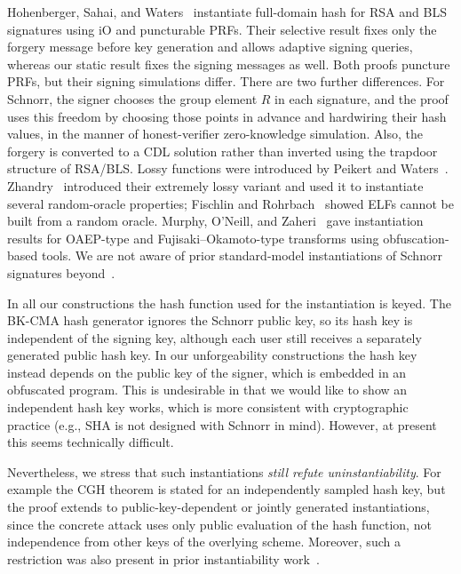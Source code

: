  Hohenberger, Sahai, and Waters~\cite{EC:HohSahWat14} instantiate full-domain hash for RSA and BLS signatures using iO and puncturable PRFs. Their selective result fixes only the forgery message before key generation and allows adaptive signing queries, whereas our static result fixes the signing messages as well. Both proofs puncture PRFs, but their signing simulations differ. There are two further differences. For Schnorr, the signer chooses the group element $R$ in each signature, and the proof uses this freedom by choosing those points in advance and hardwiring their hash values, in the manner of honest-verifier zero-knowledge simulation. Also, the forgery is converted to a CDL solution rather than inverted using the trapdoor structure of RSA/BLS. Lossy functions were introduced by Peikert and Waters~\cite{STOC:PeiWat08,JACM:PeiWat11}. Zhandry~\cite{C:Zhandry16} introduced their extremely lossy variant and used it to instantiate several random-oracle properties; Fischlin and Rohrbach~\cite{TCC:FisRoh23} showed ELFs cannot be built from a random oracle. Murphy, O'Neill, and Zaheri~\cite{AC:MurONeZah22} gave instantiation results for OAEP-type and Fujisaki--Okamoto-type transforms using obfuscation-based tools. We are not aware of prior standard-model instantiations of Schnorr signatures beyond~\cite{AC:PaiVer05}.

 In all our constructions the hash function used for the instantiation is keyed. The BK-CMA hash generator ignores the Schnorr public key, so its hash key is independent of the signing key, although each user still receives a separately generated public hash key. In our unforgeability constructions the hash key instead depends on the public key of the signer, which is embedded in an obfuscated program. This is undesirable in that we would like to show an independent hash key works, which is more consistent with cryptographic practice (e.g., SHA is not designed with Schnorr in mind). However, at present this seems technically difficult.

Nevertheless, we stress that such instantiations \emph{still refute uninstantiability}. For example the CGH theorem is stated for an independently sampled hash key, but the proof extends to public-key-dependent or jointly generated instantiations, since the concrete attack uses only public evaluation of the hash function, not independence from other keys of the overlying scheme. Moreover, such a restriction was also present in prior instantiability work~\cite{EC:HohSahWat14}.
